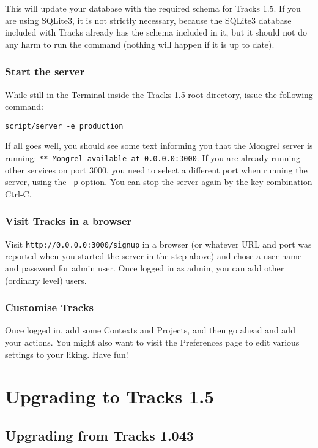 \documentclass[10pt,twoside]{memoir}
\begin{document}
This will update your database with the required schema for Tracks 1.5. If you are using SQLite3, it is not strictly necessary, because the SQLite3 database included with Tracks already has the schema included in it, but it should not do any harm to run the command (nothing will happen if it is up to date).


\subsection{Start the server}
\label{startserver_install}

While still in the Terminal inside the Tracks 1.5 root directory, issue the following command:


\texttt{script/server -e production}


If all goes well, you should see some text informing you that the Mongrel server is running: \texttt{** Mongrel available at 0.0.0.0:3000}. If you are already running other services on port 3000, you need to select a different port when running the server, using the \texttt{-p} option. You can stop the server again by the key combination Ctrl-C.


\subsection{Visit Tracks in a browser}
\label{signup_install}

Visit \texttt{http://0.0.0.0:3000/signup} in a browser (or whatever URL and port was reported when you started the server in the step above) and chose a user name and password for admin user. Once logged in as admin, you can add other (ordinary level) users.


\subsection{Customise Tracks}
\label{customise_install}

Once logged in, add some Contexts and Projects, and then go ahead and add your actions. You might also want to visit the Preferences page to edit various settings to your liking. Have fun!


\chapter{Upgrading to Tracks 1.5}
\label{upgrading}

\section{Upgrading from Tracks 1.043}
\label{upgrading_1043}
\end{document}
